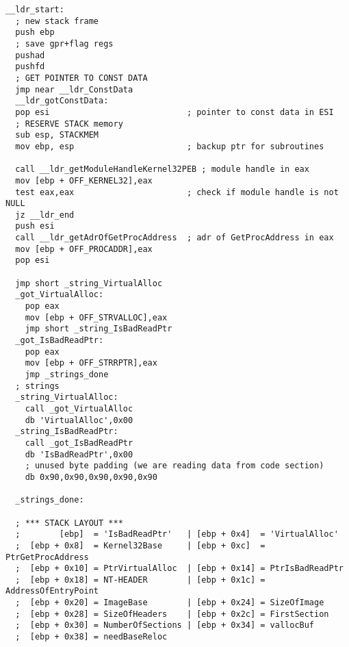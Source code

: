 \documentclass{article}
\begin{document}
\begin{lstlisting}[frame=single]
__ldr_start:
  ; new stack frame
  push ebp
  ; save gpr+flag regs
  pushad
  pushfd
  ; GET POINTER TO CONST DATA
  jmp near __ldr_ConstData
  __ldr_gotConstData:
  pop esi                            ; pointer to const data in ESI
  ; RESERVE STACK memory
  sub esp, STACKMEM
  mov ebp, esp                       ; backup ptr for subroutines

  call __ldr_getModuleHandleKernel32PEB ; module handle in eax
  mov [ebp + OFF_KERNEL32],eax
  test eax,eax                       ; check if module handle is not NULL
  jz __ldr_end
  push esi
  call __ldr_getAdrOfGetProcAddress  ; adr of GetProcAddress in eax
  mov [ebp + OFF_PROCADDR],eax
  pop esi

  jmp short _string_VirtualAlloc
  _got_VirtualAlloc:
    pop eax
    mov [ebp + OFF_STRVALLOC],eax
    jmp short _string_IsBadReadPtr
  _got_IsBadReadPtr:
    pop eax
    mov [ebp + OFF_STRRPTR],eax
    jmp _strings_done
  ; strings
  _string_VirtualAlloc:
    call _got_VirtualAlloc
    db 'VirtualAlloc',0x00
  _string_IsBadReadPtr:
    call _got_IsBadReadPtr
    db 'IsBadReadPtr',0x00
    ; unused byte padding (we are reading data from code section)
    db 0x90,0x90,0x90,0x90,0x90

  _strings_done:

  ; *** STACK LAYOUT ***
  ;        [ebp]  = 'IsBadReadPtr'   | [ebp + 0x4]  = 'VirtualAlloc'
  ;  [ebp + 0x8]  = Kernel32Base     | [ebp + 0xc]  = PtrGetProcAddress
  ;  [ebp + 0x10] = PtrVirtualAlloc  | [ebp + 0x14] = PtrIsBadReadPtr
  ;  [ebp + 0x18] = NT-HEADER        | [ebp + 0x1c] = AddressOfEntryPoint
  ;  [ebp + 0x20] = ImageBase        | [ebp + 0x24] = SizeOfImage
  ;  [ebp + 0x28] = SizeOfHeaders    | [ebp + 0x2c] = FirstSection
  ;  [ebp + 0x30] = NumberOfSections | [ebp + 0x34] = vallocBuf
  ;  [ebp + 0x38] = needBaseReloc


\end{lstlisting}
\end{document}
